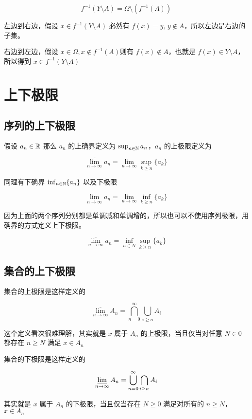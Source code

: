 \[
f^{-1}(Y \setminus A) = \Omega \setminus (f^{-1}(A))
\]

左边到右边，假设 $x \in f^{-1}(Y \setminus A)$ 必然有 $f(x) = y,\, y \notin A$，所以左边是右边的子集。

右边到左边，假设 $x \in \Omega, x \notin f^{-1}(A) $则有 $f(x) \notin A$，也就是 $f(x) \in Y \setminus A$，所以得到 $x \in f^{-1}(Y \setminus A)$

\section{上下极限}


\subsection{序列的上下极限}

假设 $a_n \in \mathbb{R}$ 那么 $a_n$ 的上确界定义为 $\sup_{n \in \mathbb{N}} a_n$，$a_n$ 的上极限定义为

\[
\overline{\lim_{n \to \infty}}a_n = \lim_{n \to \infty} \sup_{k \ge n} \{ a_k \}
\]

同理有下确界 $\inf_{n \in \mathbb{N}} \{ a_n \}$ 以及下极限

\[
\lim_{\overline{n \to \infty}}a_n = \lim_{n \to \infty} \inf_{k \ge n} \{ a_k  \}
\]

因为上面的两个序列分别都是单调减和单调增的，所以也可以不使用序列极限，用确界的方式定义上下极限。

\[
\overline{\lim_{n \to \infty}}a_n = \inf_{n \in N} \sup_{k \ge n} \{ a_k \}
\]


\subsection{集合的上下极限}

集合的上极限是这样定义的

\[
\overline{\lim_{n \to \infty}}A_n  = \bigcap_{n=0}^{\infty}\bigcup_{i \ge n}A_i
\]

这个定义看次很难理解，其实就是 $x$ 属于 $A_n$ 的上极限，当且仅当对任意 $N \in 0$ 都存在 $n \ge N$ 满足 $x \in A_n$


集合的下极限是这样定义的

\[
\varliminf_{n \to \infty}A_n  = \bigcup_{n=0}^{\infty}\bigcap_{i \ge n}A_i
\]

其实就是 $x$ 属于 $A_n$ 的下极限，当且仅当存在 $N  \ge 0$ 满足对所有的 $n \ge N$，$x \in A_n$